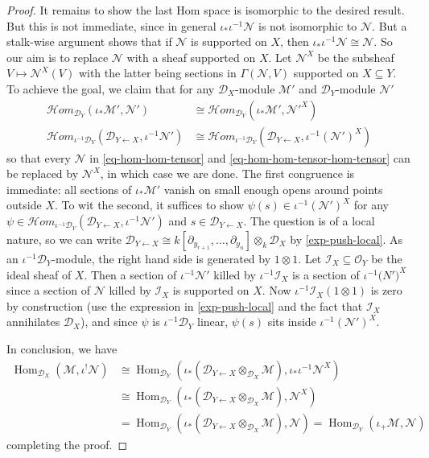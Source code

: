 \documentclass[11pt, a4paper]{article}
\theoremstyle{definition}
\newcommand{\Hom}[0]{\operatorname{Hom}}
\begin{document}
\begin{proof}
        It remains to show the last Hom space is isomorphic to the desired result. But this is not immediate, since in general $\iota_*\iota^{-1}\mathcal N$ is not isomorphic to $\mathcal N$. But a stalk-wise argument shows that if $\mathcal N$ is supported on $X$, then $\iota_*\iota^{-1}\mathcal N\cong\mathcal N$. So our aim is to replace $\mathcal N$ with a sheaf supported on $X$. Let $\mathcal N^X$ be the subsheaf $V\mapsto \mathcal N^X(V)$ with the latter being sections in $\Gamma(\mathcal N, V)$ supported on $X\subseteq Y$. To achieve the goal, we claim that for any $\mathcal D_X$-module $\mathcal M'$ and $\mathcal D_Y$-module $\mathcal N'$
        \begin{align*}
            \mathcal Hom_{\mathcal D_Y}(\iota_*\mathcal M',\mathcal N')&\cong\mathcal Hom_{\mathcal D_Y}(\iota_*\mathcal M',\mathcal N'^X)\\
            \mathcal Hom_{\iota^{-1}\mathcal D_Y}(\mathcal D_{Y\leftarrow X},\iota^{-1}\mathcal N')&\cong \mathcal Hom_{\iota^{-1}\mathcal D_Y}(\mathcal D_{Y\leftarrow X},\iota^{-1}(\mathcal N')^{X})
        \end{align*}
        so that every $\mathcal N$ in \cref{eq-hom-hom-tensor} and \cref{eq-hom-hom-tensor-hom-tensor} can be replaced by $\mathcal N^X$, in which case we are done. The first congruence is immediate: all sections of $\iota_*\mathcal M'$ vanish on small enough opens around points outside $X$. To wit the second, it suffices to show $\psi(s)\in\iota^{-1}(\mathcal N')^{X}$ for any $\psi\in\mathcal Hom_{\iota^{-1}\mathcal D_Y}(\mathcal D_{Y\leftarrow X},\iota^{-1}\mathcal N')$ and $s\in\mathcal D_{Y\leftarrow X}$. The question is of a local nature, so we can write $\mathcal D_{Y\leftarrow X}\cong k[\partial_{y_{r+1}},\dots,\partial_{y_n}]\otimes_k\mathcal D_X$ by \cref{exp-push-local}. As an $\iota^{-1}\mathcal D_Y$-module, the right hand side is generated by $1\otimes 1$. Let $\mathcal I_X\subseteq\mathcal O_Y$ be the ideal sheaf of $X$. Then a section of $\iota^{-1}\mathcal N'$ killed by $\iota^{-1}\mathcal I_X$ is a section of $\iota^{-1}\mathcal (N')^X$ since a section of $\mathcal N$ killed by $\mathcal I_X$ is supported on $X$. Now $\iota^{-1}\mathcal I_X(1\otimes 1)$ is zero by construction (use the expression in \cref{exp-push-local} and the fact that $\mathcal I_X$ annihilates $\mathcal D_X$), and since $\psi$ is $\iota^{-1}\mathcal D_Y$ linear, $\psi(s)$ sits inside $\iota^{-1}(\mathcal N')^{X}$.

        In conclusion, we have
        \begin{align*}
            \Hom_{\mathcal D_X}(\mathcal M,\iota^!\mathcal N)&\cong\Hom_{\mathcal D_Y}(\iota_*(\mathcal D_{Y\leftarrow X}\otimes_{\mathcal D_X}\mathcal M),\iota_*\iota^{-1}\mathcal N^X)\\
            &\cong\Hom_{\mathcal D_Y}(\iota_*(\mathcal D_{Y\leftarrow X}\otimes_{\mathcal D_X}\mathcal M),\mathcal N^X)\\
            &=\Hom_{\mathcal D_Y}(\iota_*(\mathcal D_{Y\leftarrow X}\otimes_{\mathcal D_X}\mathcal M),\mathcal N)=\Hom_{\mathcal D_Y}(\iota_+\mathcal M,\mathcal N)
        \end{align*}
        completing the proof.
    \end{proof}
\end{document}
